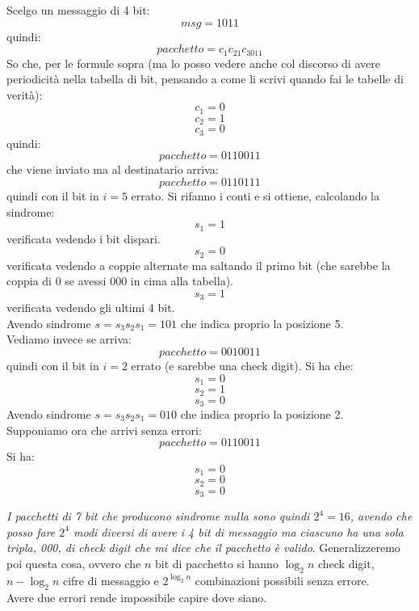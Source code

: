 \documentclass[a4paper,12pt, oneside]{book}
\begin{document}
\begin{esempio}
  Scelgo un messaggio di 4 bit:
  \[msg=1011\]
  quindi:
  \[pacchetto=c_1c_21c_3011\]
  So che, per le formule sopra (ma lo posso vedere anche col discorso di avere
  periodicità nella tabella di bit, pensando a come li scrivi quando fai le
  tabelle di verità):
  \[c_1=0\]
  \[c_2=1\]
  \[c_3=0\]
  quindi:
  \[pacchetto=0110011\]
  che viene inviato ma al destinatario arriva:
  \[pacchetto=0110111\]
  quindi con il bit in $i=5$ errato. Si rifanno i conti e si ottiene, calcolando
  la sindrome:
  \[s_1=1\]
  verificata vedendo i bit dispari.
  \[s_2=0\]
  verificata vedendo a coppie alternate ma saltando il primo bit (che sarebbe la
  coppia di 0 se avessi 000 in cima alla tabella).
  \[s_3=1\]
  verificata vedendo gli ultimi 4 bit.\\
  Avendo sindrome $s=s_3s_2s_1=101$ che indica proprio la posizione 5.\\
  Vediamo invece se arriva:
  \[pacchetto=0010011\]
  quindi con il bit in $i=2$ errato (e sarebbe una check digit). Si ha che:
  \[s_1=0\]
  \[s_2=1\]
  \[s_3=0\]
  Avendo sindrome $s=s_3s_2s_1=010$ che indica proprio la posizione 2.\\
  Supponiamo ora che arrivi senza errori:
  \[pacchetto=0110011\]
  Si ha:
  \[s_1=0\]
  \[s_2=0\]
  \[s_3=0\]
\end{esempio}
\textit{I pacchetti di 7 bit che producono sindrome nulla sono quindi
  $2^{4}=16$, avendo che posso fare $2^4$ modi diversi di avere i 4 bit di
  messaggio ma ciascuno ha una sola tripla, 000, di check digit che mi dice che
  il pacchetto è valido}. Generalizzeremo poi questa cosa, ovvero che $n$ bit di
pacchetto si hanno $\log_2 n$ check digit, $n-\log_2 n$ cifre di messaggio e
$2^{\log_2 n}$ combinazioni possibili senza errore. \\ 
Avere due errori rende impossibile capire dove siano.
\end{document}

